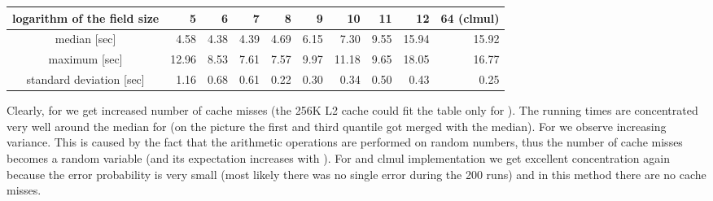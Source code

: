 \documentclass[11pt]{article}
\begin{document}
{\footnotesize
\begin{center}
\begin{tabular}{|c|r|r|r|r|r|r|r|r|r|}\hline
logarithm of the field size &  5 & 6 & 7 & 8 & 9 & 10 & 11 & 12 & 64 (clmul)\\\hline
median [sec] &  4.58 & 4.38 & 4.39 & 4.69 & 6.15 & 7.30 & 9.55 & 15.94 & 15.92\\\hline
maximum [sec] & 12.96 &  8.53 & 7.61 & 7.57 & 9.97 & 11.18 & 9.65 & 18.05 & 16.77\\\hline
standard deviation [sec] & 1.16 & 0.68 & 0.61 & 0.22 & 0.30 & 0.34 & 0.50 & 0.43 & 0.25 \\\hline
\end{tabular}
\end{center}
}
 
 Clearly, for  we get increased number of cache misses (the 256K L2 cache could fit the table only for ). 
 The running times are concentrated very well around the median for  (on the picture the first and third quantile got merged with the median).
 For  we observe increasing variance. This is caused by the fact that the arithmetic operations are performed on random numbers,
 thus the number of cache misses becomes a random variable (and its expectation increases with ). 
 For  and clmul implementation we get excellent concentration again because the error probability is very small (most likely there was no single error during the 200 runs) and in this method there are no cache misses. 
\end{document}
